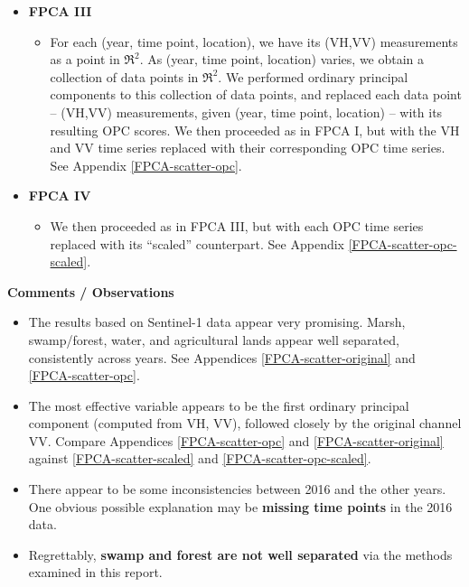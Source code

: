 \begin{itemize}
\item
	\textbf{FPCA III}
	\begin{itemize}
	\item
		For each (year, time point, location), we have its (VH,VV) measurements as a point in $\Re^{2}$.
		As (year, time point, location) varies, we obtain a collection of data points in $\Re^{2}$.
		We performed ordinary principal components to this collection of data points,
		and replaced each data point -- (VH,VV) measurements, given (year, time point, location) --
		with its resulting OPC scores.
		We then proceeded as in FPCA I, but with the VH and VV time series replaced
		with their corresponding OPC time series.
		See Appendix \ref{FPCA-scatter-opc}.
	\end{itemize}

\item
	\textbf{FPCA IV}
	\begin{itemize}
	\item
		We then proceeded as in FPCA III, but with each OPC time series replaced
		with its ``scaled'' counterpart.
		See Appendix \ref{FPCA-scatter-opc-scaled}.
	\end{itemize}
\end{itemize}


\vskip 0.5cm
\noindent
\textbf{Comments / Observations}
\begin{itemize}
\item
	The results based on Sentinel-1 data appear very promising.
	Marsh, swamp/forest, water, and agricultural lands appear well separated, consistently across years.
	See Appendices \ref{FPCA-scatter-original} and \ref{FPCA-scatter-opc}.
\item
	The most effective variable appears to be the first ordinary principal component (computed from VH, VV),
	followed closely by the original channel VV.
	Compare Appendices \ref{FPCA-scatter-opc} and \ref{FPCA-scatter-original}
	against \ref{FPCA-scatter-scaled} and \ref{FPCA-scatter-opc-scaled}.
\item
	There appear to be some inconsistencies between 2016 and the other years.
	One obvious possible explanation may be \textbf{\color{red}missing time points} in the 2016 data.
\item
	Regrettably, \textbf{\color{red}swamp and forest are not well separated}
	via the methods examined in this report.
\end{itemize}


\renewcommand{\theenumi}{\roman{enumi}}
\renewcommand{\labelenumi}{\textnormal{(\theenumi)}$\;\;$}

